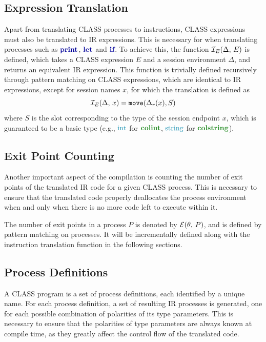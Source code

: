 \subsection{Expression Translation}

Apart from translating \ac{CLASS} processes to instructions, \ac{CLASS} expressions must also be translated to \ac{IR} expressions. This is necessary for when translating processes such as $\printp$, $\letp$ and $\ifp$. To achieve this, the function $\mathcal{I}_E(\Delta,\,E)$ is defined, which takes a \ac{CLASS} expression $E$ and a session environment $\Delta$, and returns an equivalent \ac{IR} expression. This function is trivially defined recursively through pattern matching on \ac{CLASS} expressions, which are identical to \ac{IR} expressions, except for session names $x$, for which the translation is defined as
\[
\mathcal{I}_E(\Delta,\,x) = \texttt{move}(\Delta_r(x), S)
\]
where $S$ is the slot corresponding to the type of the session endpoint $x$, which is guaranteed to be a basic type (e.g., $\ints$ for $\colintt$, $\strings$ for $\colstringt$).

\subsection{Exit Point Counting}

Another important aspect of the compilation is counting the number of exit points of the translated \ac{IR} code for a given \ac{CLASS} process. This is necessary to ensure that the translated code properly deallocates the process environment when and only when there is no more code left to execute within it.

The number of exit points in a process $P$ is denoted by $\mathcal{E}(\theta,\,P)$, and is defined by pattern matching on processes. It will be incrementally defined along with the instruction translation function in the following sections.

\subsection{Process Definitions} \label{subsection:ProcessDefinitions}

A \ac{CLASS} program is a set of process definitions, each identified by a unique name. For each process definition, a set of resulting \ac{IR} processes is generated, one for each possible combination of polarities of its type parameters. This is necessary to ensure that the polarities of type parameters are always known at compile time, as they greatly affect the control flow of the translated code.

